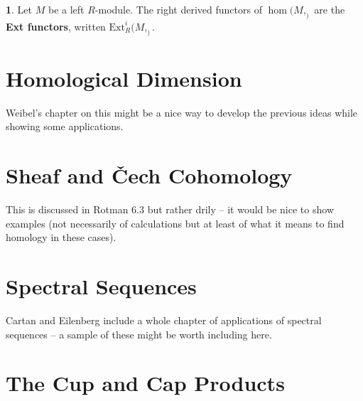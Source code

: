 \documentclass[oneside,english]{amsbook}
\numberwithin{section}{chapter}
\theoremstyle{plain}
\theoremstyle{definition}
\newtheorem{defn}[thm]{\protect\definitionname}
\providecommand{\definitionname}{Definition}
\providecommand{\Cech}{\v{C}ech }
\begin{document}
			\begin{defn}
				Let $M$ be a left $R$-module. The right derived functors of $\hom(M, _)$ are the \textbf{Ext functors}, written $\text{Ext}^i_R(M, _)$.
			\end{defn}
	
	\chapter{Homological Dimension}
	
	Weibel's chapter on this might be a nice way to develop the previous ideas while showing some applications.
	
	\chapter{Sheaf and \Cech Cohomology}
	
	This is discussed in Rotman 6.3 but rather drily -- it would be nice to show examples (not necessarily of calculations but at least of what it means to find homology in these cases).

	\chapter{Spectral Sequences}
	
	Cartan and Eilenberg include a whole chapter of applications of spectral sequences -- a sample of these might be worth including here.

	\chapter{The Cup and Cap Products}
\end{document}
